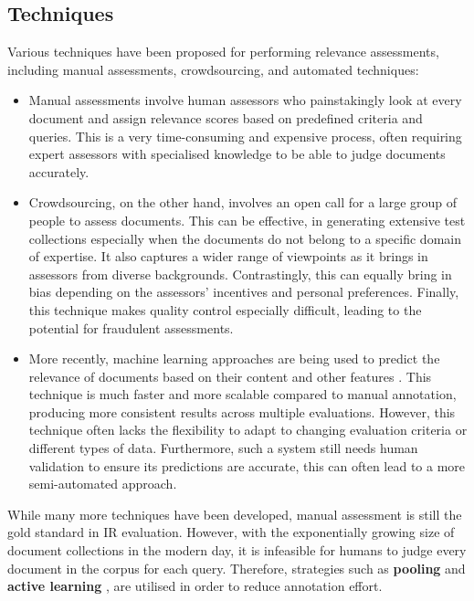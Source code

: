 \documentclass{l4proj}
\begin{document}
\subsection{Techniques}
Various techniques have been proposed for performing relevance assessments, including manual assessments, crowdsourcing, and automated techniques:
\begin{itemize}
    \item Manual assessments involve human assessors who painstakingly look at every document and assign relevance scores based on predefined criteria and queries. This is a very time-consuming and expensive process, often requiring expert assessors with specialised knowledge to be able to judge documents accurately. 

    \item Crowdsourcing, on the other hand, involves an open call for a large group of people to assess documents. This can be effective, in generating extensive test collections especially when the documents do not belong to a specific domain of expertise. It also captures a wider range of viewpoints as it brings in assessors from diverse backgrounds. Contrastingly, this can equally bring in bias depending on the assessors' incentives and personal preferences. Finally, this technique makes quality control especially difficult, leading to the potential for fraudulent assessments.
    
    \item More recently, machine learning approaches are being used to predict the relevance of documents based on their content and other features \citep{cao2007ltr}. This technique is much faster and more scalable compared to manual annotation, producing more consistent results across multiple evaluations. However, this technique often lacks the flexibility to adapt to changing evaluation criteria or different types of data. Furthermore, such a system still needs human validation to ensure its predictions are accurate, this can often lead to a more semi-automated approach.
\end{itemize}

While many more techniques have been developed, manual assessment is still the gold standard in IR evaluation. However, with the exponentially growing size of document collections in the modern day, it is infeasible for humans to judge every document in the corpus for each query. Therefore, strategies such as \textbf{pooling} and \textbf{active learning} \citep{rahman2020testal}, are utilised in order to reduce annotation effort.
\end{document}

